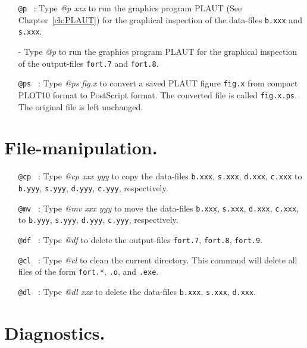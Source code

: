 \documentclass[12pt]{report}
\begin{document}
\begin{itemize}

\item[\tt @p]~:
  Type {\it @p xxx} to run the graphics program {\cal PLAUT}
  (See Chapter~\ref{ch:PLAUT})
  for the graphical inspection of the data-files 
  {\tt b.xxx} and {\tt s.xxx}. 
\item[-]
  Type {\it @p} to run the graphics program {\cal PLAUT}
  for the graphical inspection of the output-files 
  {\tt fort.7} and {\tt fort.8}.

\item[\tt @ps]~:
  Type {\it @ps fig.x} to convert a saved {\cal PLAUT} figure {\tt fig.x}
  from compact {\cal PLOT10} format to {\cal PostScript} format.
  The converted file is called {\tt fig.x.ps}. 
  The original file is left unchanged.

\end{itemize}

\section{ File-manipulation.} 

\begin{itemize}

\item[\tt @cp]~:
  Type {\it @cp xxx yyy} 
  to copy the data-files 
  {\tt b.xxx}, {\tt s.xxx}, {\tt d.xxx}, {\tt c.xxx} to
  {\tt b.yyy}, {\tt s.yyy}, {\tt d.yyy}, {\tt c.yyy}, respectively.

\item[\tt @mv]~:
  Type {\it @mv xxx yyy} 
  to move the data-files 
  {\tt b.xxx}, {\tt s.xxx}, {\tt d.xxx}, {\tt c.xxx}, to
  {\tt b.yyy}, {\tt s.yyy}, {\tt d.yyy}, {\tt c.yyy}, respectively.

\item[\tt @df]~:
  Type {\it @df} 
  to delete the output-files 
  {\tt fort.7}, {\tt fort.8}, {\tt fort.9}.

\item[\tt @cl]~:
  Type {\it @cl} 
  to clean the current directory.
  This command will delete  all files of the form
  {\tt fort.*}, {\tt *.o}, and {\tt *.exe}.

\item[\tt @dl]~:
  Type {\it @dl xxx} 
 to delete the data-files 
  {\tt b.xxx}, {\tt s.xxx}, {\tt d.xxx}.
\end{itemize}

\section{ Diagnostics.} 
\end{document}
